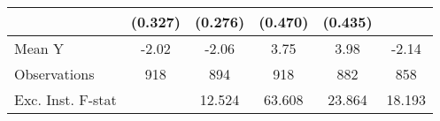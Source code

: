 {\begin{tabular}{l*{5}{c}}
            &     (0.327)         &     (0.276)         &     (0.470)         &     (0.435)         &                     \\
\midrule
Mean Y      &       -2.02         &       -2.06         &        3.75         &        3.98         &       -2.14         \\
Observations&         918         &         894         &         918         &         882         &         858         \\
Exc. Inst. F-stat&                     &      12.524         &      63.608         &      23.864         &      18.193         \\
\bottomrule
\end{tabular}
}
